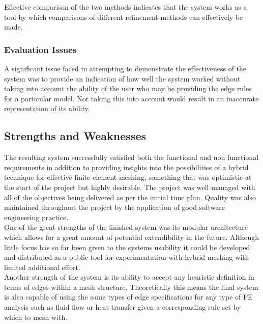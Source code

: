\noindent
Effective comparison of the two methods indicates that the system works as a tool by which comparisons of different refinement methods can effectively be made. 

%


\subsubsection{Evaluation Issues}
A significant issue faced in attempting to demonstrate the effectiveness of the system was to provide an indication of how well the system worked without taking into account the ability of the user who may be providing the edge rules for a particular model. Not taking this into account would result in an inaccurate representation of its ability.

\subsection{Strengths and Weaknesses}
The resulting system successfully satisfied both the functional and non functional requirements in addition to providing insights into the possibilities of a hybrid technique for effective finite element meshing, something that was optimistic at the start of the project but highly desirable. The project was well managed with all of the objectives being delivered as per the initial time plan. Quality was also maintained throughout the project by the application of good software engineering practice. \\

\noindent
One of the great strengths of the finished system was its modular architecture which allows for a great amount of potential extendibility in the future. Although little focus has so far been given to the systems usability it could be developed and distributed as a public tool for experimentation with hybrid meshing with limited additional effort. \\

\noindent
Another strength of the system is its ability to accept any heuristic definition in terms of edges within a mesh structure. Theoretically this means the final system is also capable of using the same types of edge specifications for any type of FE analysis such as fluid flow or heat transfer given a corresponding rule set by which to mesh with. \\


